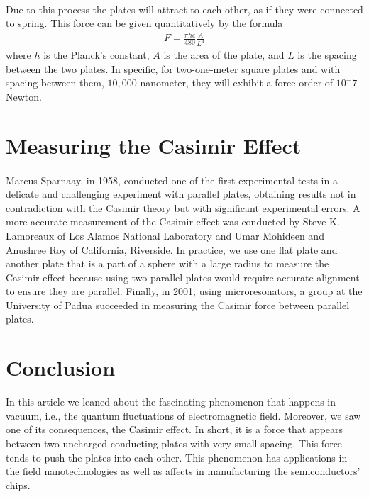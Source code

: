\documentclass{article}
\begin{document}
        \paragraph{}
        Due to this process the plates will attract to each other, as if they were connected to spring.
        This force can be given quantitatively by the formula \cite{byjus}
        \begin{align}
            F = \frac{\pi h c}{480} \frac{A}{L^4}
        \end{align}
        where $h$ is the Planck's constant, $A$ is the area of the plate, and $L$ is the spacing between the two plates. In specific, for two-one-meter square plates and with spacing between them, $10,000$ nanometer, they will exhibit a force order of $10^-7$ Newton.

    \section{Measuring the Casimir Effect}
        \paragraph{}
        Marcus Sparnaay, in 1958, conducted one of the first experimental tests in a delicate and challenging experiment with parallel plates, obtaining results not in contradiction with the Casimir theory but with significant experimental errors. A more accurate measurement of the Casimir effect was conducted by Steve K. Lamoreaux of Los Alamos National Laboratory and Umar Mohideen and Anushree Roy of California, Riverside. In practice, we use one flat plate and another plate that is a part of a sphere with a large radius to measure the Casimir effect because using two parallel plates would require accurate alignment to ensure they are parallel. Finally, in 2001, using microresonators, a group at the University of Padua succeeded in measuring the Casimir force between parallel plates.
    
    \section{Conclusion}
    In this article we leaned about the fascinating phenomenon that happens in vacuum, i.e., the quantum fluctuations of electromagnetic field. Moreover, we saw one of its consequences, the Casimir effect. In short, it is a force that appears between two uncharged conducting plates with very small spacing. This force tends to 
    push the plates into each other. This phenomenon has applications in the field nanotechnologies as well as affects in manufacturing the semiconductors' chips.


    \printbibliography
\end{document}
